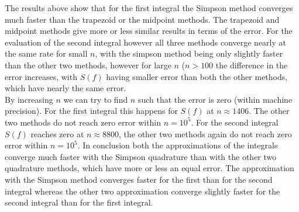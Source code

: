 \documentclass[10pt,a4paper]{article}
\begin{document}
\noindent The results above show that for the first integral the Simpson method converges much faster than the trapezoid or the midpoint methods. The trapezoid and midpoint methods give more or less similar results in terms of the error. For the evaluation of the second integral however all three methods converge nearly at the same rate for small $n$, with the simpson method being only slightly faster than the other two methods, however for large $n$ ($n>100$ the difference in the error increases, with $S(f)$ having smaller error than both the other methods, which have nearly the same error.\\
\noindent By increasing $n$ we can try to find $n$ such that the error is zero (within machine precision). For the first integral this happens for $S(f)$ at $n \approx 1406$. The other two methods do not reach zero error within $n = 10^5$. For the second integral $S(f)$ reaches zero at $n \approx 8800$, the other two methods again do not reach zero error within $n = 10^5$.
In conclusion both the approximations of the integrals converge much faster with the Simpson quadrature than with the other two quadrature methods, which have more or less an equal error. The approximation with the Simpson method converges faster for the first than for the second integral whereas the other two approximation converge slightly faster for the second integral than for the first integral.
\end{document}
